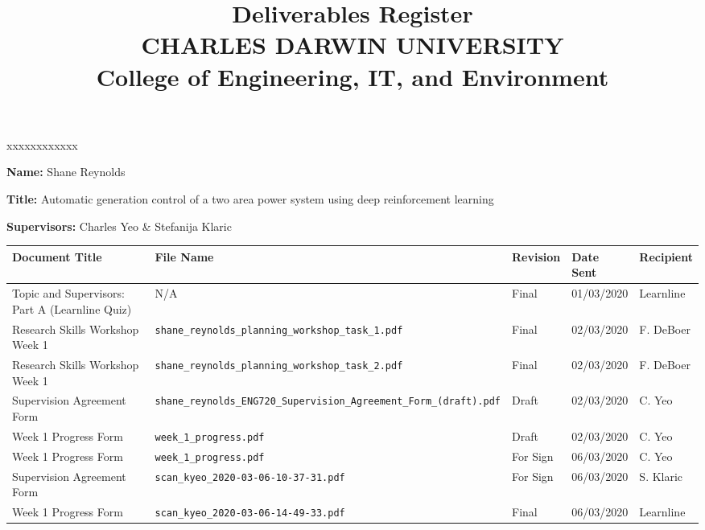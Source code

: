 \documentclass[10pt, landscape]{article}
\title{	
		Deliverables Register\\
		CHARLES DARWIN UNIVERSITY\\
		College of Engineering, IT, and Environment
	  }
\author{}
\date{}
\begin{document}
	
	\maketitle
	
	\begin{namelist}{xxxxxxxxxxxx}
		\item[{\bf Name:}]
			Shane Reynolds
		\item[{\bf Title:}]
			Automatic generation control of a two area power system using deep reinforcement learning
		\item[{\bf Supervisors:}]
			Charles Yeo \& Stefanija Klaric
	\end{namelist}
	
	\small
	\begin{longtable}{p{7cm}p{10cm}p{1.5cm}p{2cm}p{2cm}}
	\toprule
	\textbf{Document Title}							& \textbf{File Name}				& \textbf{Revision} & \textbf{Date Sent} 	& \textbf{Recipient} \\
	\midrule
	\endhead
	Topic and Supervisors: Part A (Learnline Quiz)	& N/A																		& Final 			& 01/03/2020		 	& Learnline\\
	
	Research Skills Workshop Week 1					& \verb|shane_reynolds_planning_workshop_task_1.pdf|						& Final				& 02/03/2020		 	& F. DeBoer\\
	
	Research Skills Workshop Week 1					& \verb|shane_reynolds_planning_workshop_task_2.pdf|						& Final				& 02/03/2020			& F. DeBoer\\
	
	Supervision Agreement Form						& \verb|shane_reynolds_ENG720_Supervision_Agreement_Form_(draft).pdf|		& Draft				& 02/03/2020			& C. Yeo\\
	
	Week 1 Progress Form							& \verb|week_1_progress.pdf|												& Draft				& 02/03/2020			& C. Yeo\\
	
	Week 1 Progress Form							& \verb|week_1_progress.pdf|												& For Sign			& 06/03/2020			& C. Yeo\\
	
	Supervision Agreement Form						& \verb|scan_kyeo_2020-03-06-10-37-31.pdf|									& For Sign			& 06/03/2020			& S. Klaric\\
	
	Week 1 Progress Form							& \verb|scan_kyeo_2020-03-06-14-49-33.pdf|									& Final				& 06/03/2020			& Learnline\\
	

\end{longtable}
\end{document}
